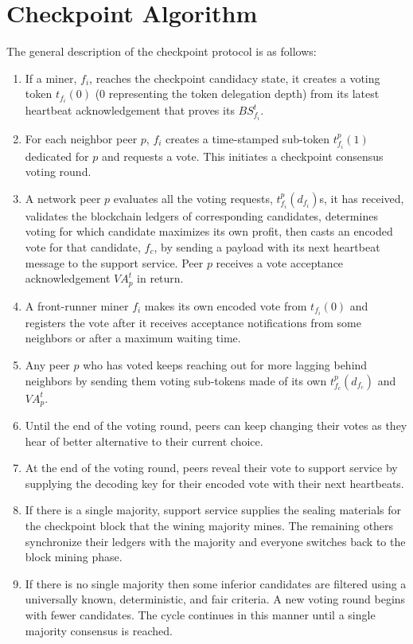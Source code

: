 \section{Checkpoint Algorithm}
\label{s-algorithm}
The general description of the checkpoint protocol is as follows:
\begin{enumerate}
\item If a miner, $f_i$, reaches the checkpoint candidacy state, it creates a voting token $t_{f_i}(0)$ (0 representing the token delegation depth) from its latest heartbeat acknowledgement that proves its  $BS_{f_i}^t$.
\item For each neighbor peer $p$, $f_i$ creates a time-stamped sub-token $t_{f_i}^{p}(1)$ dedicated for $p$ and requests a vote. This initiates a checkpoint consensus voting round.
\item A network peer $p$ evaluates all the voting requests, $t_{f_i}^{p}(d_{f_i})$s, it has received, validates the blockchain ledgers of corresponding candidates, determines voting for which candidate maximizes its own profit, then casts an encoded vote for that candidate, $f_c$, by sending a payload with its next heartbeat message to the support service. Peer $p$ receives a vote acceptance acknowledgement $VA_p^t$ in return.
\item A front-runner miner $f_i$ makes its own encoded vote from $t_{f_i}(0)$ and registers the vote after it receives acceptance notifications from some neighbors or after a maximum waiting time.
\item Any peer $p$ who has voted keeps reaching out for more lagging behind neighbors by sending them voting sub-tokens made of its own $t_{f_c}^{p}(d_{f_c})$ and $VA_p^t$.
\item Until the end of the voting round, peers can keep changing their votes as they hear of better alternative to their current choice.   
\item At the end of the voting round, peers reveal their vote to support service by supplying the decoding key for their encoded vote with their next heartbeats.
\item If there is a single majority, support service supplies the sealing materials for the checkpoint block that the wining majority mines. The remaining others synchronize their ledgers with the majority and everyone switches back to the block mining phase.
\item If there is no single majority then some inferior candidates are filtered using a universally known, deterministic, and fair criteria. A new voting round begins with fewer candidates. The cycle continues in this manner until a single majority consensus is reached.                              
\end{enumerate}

